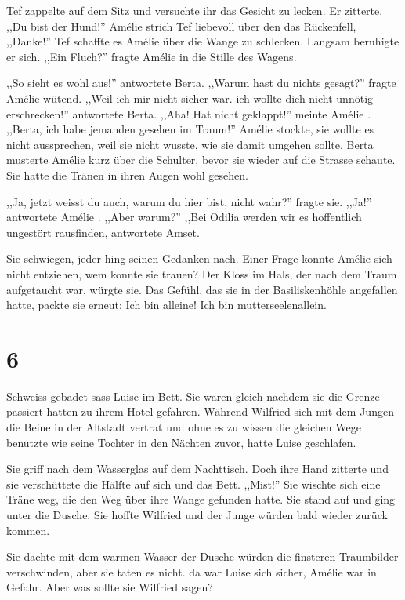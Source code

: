 \documentclass[11pt,titlepage,a5paper]{book}
\newcommand{\am}{Amélie }
\begin{document}
Tef zappelte auf dem Sitz und versuchte ihr das Gesicht zu lecken. Er zitterte. ,,Du bist der Hund!'' \am strich Tef liebevoll über den das Rückenfell, ,,Danke!'' Tef schaffte es \am über die Wange zu schlecken. Langsam beruhigte er sich. ,,Ein Fluch?'' fragte \am in die Stille des Wagens. 

,,So sieht es wohl aus!'' antwortete Berta. ,,Warum hast du nichts gesagt?'' fragte \am wütend. ,,Weil ich mir nicht sicher war. ich wollte dich nicht unnötig erschrecken!'' antwortete Berta. ,,Aha! Hat nicht geklappt!'' meinte \am . ,,Berta, ich habe jemanden gesehen im Traum!'' \am stockte, sie wollte es nicht aussprechen, weil sie nicht wusste, wie sie damit umgehen sollte. Berta musterte \am kurz über die Schulter, bevor sie wieder auf die Strasse schaute. Sie hatte die Tränen in ihren Augen wohl gesehen. 

,,Ja, jetzt weisst du auch, warum du hier bist, nicht wahr?'' fragte sie. ,,Ja!'' antwortete \am . ,,Aber warum?'' ,,Bei Odilia werden wir es hoffentlich ungestört rausfinden, antwortete Amset. 

Sie schwiegen, jeder hing seinen Gedanken nach. Einer Frage konnte \am sich nicht entziehen, wem konnte sie trauen? Der Kloss im Hals, der nach dem Traum aufgetaucht war, würgte sie. Das Gefühl, das sie in der Basiliskenhöhle angefallen hatte, packte sie erneut: Ich bin alleine! Ich bin mutterseelenallein.

\section*{6}

Schweiss gebadet sass Luise im Bett. Sie waren gleich nachdem sie die Grenze passiert hatten zu ihrem Hotel gefahren. Während Wilfried sich mit dem Jungen die Beine in der Altstadt vertrat und ohne es zu wissen die gleichen Wege benutzte wie seine Tochter in den Nächten zuvor, hatte Luise geschlafen.

Sie griff nach dem Wasserglas auf dem Nachttisch. Doch ihre Hand zitterte und sie verschüttete die Hälfte auf sich und das Bett. ,,Mist!'' Sie wischte sich eine Träne weg, die den Weg über ihre Wange gefunden hatte. Sie stand auf und ging unter die Dusche. Sie hoffte Wilfried und der Junge würden bald wieder zurück kommen.

Sie dachte mit dem warmen Wasser der Dusche würden die finsteren Traumbilder verschwinden, aber sie taten es nicht. da war Luise sich sicher, \am war in Gefahr. Aber was sollte sie Wilfried sagen?
\end{document}
